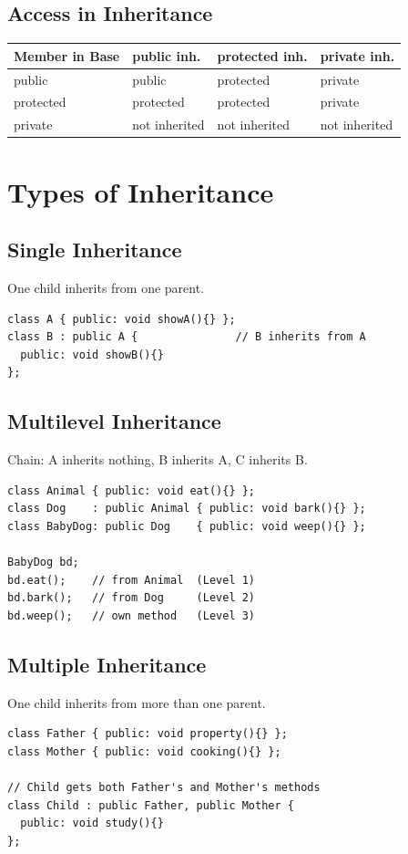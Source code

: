 \documentclass[12pt,a4paper]{report}
\begin{document}
\section{Access in Inheritance}

\begin{center}
\begin{tabular}{|l|l|l|l|}
\hline
\textbf{Member in Base} & \textbf{public inh.} & \textbf{protected inh.} & \textbf{private inh.} \\
\hline
public    & public    & protected & private \\
protected & protected & protected & private \\
private   & not inherited & not inherited & not inherited \\
\hline
\end{tabular}
\end{center}

\chapter{Types of Inheritance}

\section{Single Inheritance}
One child inherits from one parent.
\begin{lstlisting}
class A { public: void showA(){} };
class B : public A {               // B inherits from A
  public: void showB(){}
};
\end{lstlisting}

\section{Multilevel Inheritance}
Chain: A inherits nothing, B inherits A, C inherits B.
\begin{lstlisting}
class Animal { public: void eat(){} };
class Dog    : public Animal { public: void bark(){} };
class BabyDog: public Dog    { public: void weep(){} };

BabyDog bd;
bd.eat();    // from Animal  (Level 1)
bd.bark();   // from Dog     (Level 2)
bd.weep();   // own method   (Level 3)
\end{lstlisting}

\section{Multiple Inheritance}
One child inherits from more than one parent.
\begin{lstlisting}
class Father { public: void property(){} };
class Mother { public: void cooking(){} };

// Child gets both Father's and Mother's methods
class Child : public Father, public Mother {
  public: void study(){}
};
\end{lstlisting}
\end{document}

